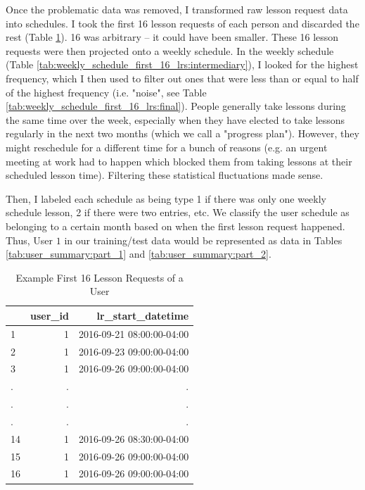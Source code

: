 \documentclass[oneside]{article}
\begin{document}
Once the problematic data was removed, I transformed raw lesson request data
into schedules. I took the first 16 lesson requests of each person and
discarded the rest (Table \ref{tab:example_1st_16_lesson_requests}). 16 was
arbitrary -- it could have been smaller. These 16 lesson requests were then
projected onto a weekly schedule. In the weekly schedule (Table
\ref{tab:weekly_schedule_first_16_lrs:intermediary}), I looked for the highest
frequency, which I then used to filter out ones that were less than or equal to
half of the highest frequency (i.e. "noise", see Table
\ref{tab:weekly_schedule_first_16_lrs:final}). People generally take lessons
during the same time over the week, especially when they have elected to take
lessons regularly in the next two months (which we call a "progress plan").
However, they might reschedule for a different time for a bunch of reasons
(e.g. an urgent meeting at work had to happen which blocked them from taking
lessons at their scheduled lesson time). Filtering these statistical
fluctuations made sense.

Then, I labeled each schedule as being type 1 if there was only one weekly
schedule lesson, 2 if there were two entries, etc. We classify the user
schedule as belonging to a certain month based on when the first lesson request
happened. Thus, User $1$ in our training/test data would be represented as data
in Tables \ref{tab:user_summary:part_1} and \ref{tab:user_summary:part_2}.

\begin{table}[]
  \centering
  \caption{Example First 16 Lesson Requests of a User}
  \label{tab:example_1st_16_lesson_requests}
  \begin{tabular}{lrr}
    \hline
     & \textbf{user\_id} & \textbf{lr\_start\_datetime} \\
    \hline
     1 & 1   & 2016-09-21 08:00:00-04:00 \\
     2 & 1   & 2016-09-23 09:00:00-04:00 \\
     3 & 1   & 2016-09-26 09:00:00-04:00 \\
     . & .   & . \\
     . & .   & . \\
     . & .   & . \\
     14 & 1   & 2016-09-26 08:30:00-04:00 \\
     15 & 1   & 2016-09-26 09:00:00-04:00 \\
     16 & 1   & 2016-09-26 09:00:00-04:00 \\
    \hline
  \end{tabular}
\end{table}
\end{document}
